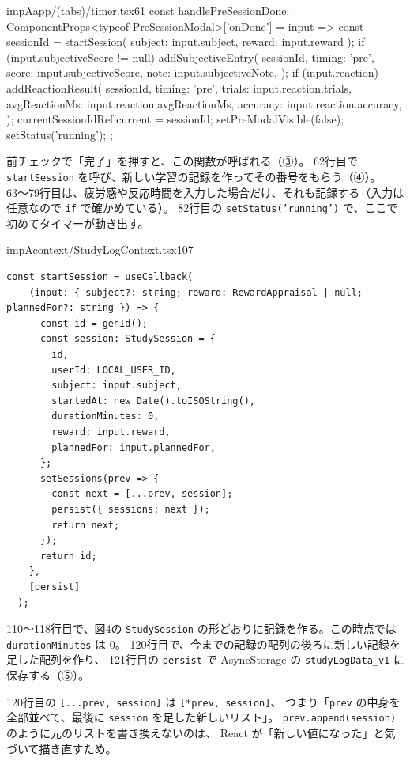 \begin{codebox}{impA}{app/(tabs)/timer.tsx}{61}
  const handlePreSessionDone: ComponentProps<typeof PreSessionModal>['onDone'] = input => {
    const sessionId = startSession({ subject: input.subject, reward: input.reward });
    if (input.subjectiveScore != null) {
      addSubjectiveEntry({
        sessionId,
        timing: 'pre',
        score: input.subjectiveScore,
        note: input.subjectiveNote,
      });
    }
    if (input.reaction) {
      addReactionResult({
        sessionId,
        timing: 'pre',
        trials: input.reaction.trials,
        avgReactionMs: input.reaction.avgReactionMs,
        accuracy: input.reaction.accuracy,
      });
    }
    currentSessionIdRef.current = sessionId;
    setPreModalVisible(false);
    setStatus('running');
  };
\end{codebox}

前チェックで「完了」を押すと、この関数が呼ばれる（③）。
62行目で \texttt{startSession} を呼び、新しい学習の記録を作ってその番号をもらう（④）。
63〜79行目は、疲労感や反応時間を入力した場合だけ、それも記録する（入力は任意なので \texttt{if} で確かめている）。
82行目の \texttt{setStatus('running')} で、ここで初めてタイマーが動き出す。

\begin{codeframe}{impA}{context/StudyLogContext.tsx}{107}
\begin{lstlisting}[style=kkts, firstnumber=107]
  const startSession = useCallback(
    (input: { subject?: string; reward: RewardAppraisal | null; plannedFor?: string }) => {
      const id = genId();
      const session: StudySession = {
        id,
        userId: LOCAL_USER_ID,
        subject: input.subject,
        startedAt: new Date().toISOString(),
        durationMinutes: 0,
        reward: input.reward,
        plannedFor: input.plannedFor,
      };
      setSessions(prev => {
        const next = [...prev, session];
        persist({ sessions: next });
        return next;
      });
      return id;
    },
    [persist]
  );
\end{lstlisting}
\end{codeframe}

110〜118行目で、図4の \texttt{StudySession} の形どおりに記録を作る。この時点では \texttt{durationMinutes} は 0。
120行目で、今までの記録の配列の後ろに新しい記録を足した配列を作り、
121行目の \texttt{persist} で AsyncStorage の \texttt{studyLogData\_v1} に保存する（⑤）。

\begin{pyaside}
  120行目の \texttt{[.{}.{}.prev, session]} は \texttt{[*prev, session]}、
  つまり「\texttt{prev} の中身を全部並べて、最後に \texttt{session} を足した新しいリスト」。
  \texttt{prev.append(session)} のように元のリストを書き換えないのは、
  React が「新しい値になった」と気づいて描き直すため。
\end{pyaside}

